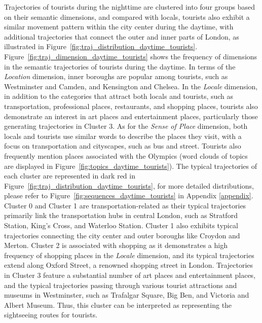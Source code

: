 \documentclass{article}
\theoremstyle{remark}
\begin{document}
Trajectories of tourists during the nighttime are clustered into four groups based on their semantic dimensions, and compared with locals, tourists also exhibit a similar movement pattern within the city center during the daytime, with additional trajectories that connect the outer and inner parts of London, as illustrated in Figure~\ref{fig:traj_distribution_daytime_tourists}. Figure~\ref{fig:traj_dimension_daytime_tourists} shows the frequency of dimensions in the semantic trajectories of tourists during the daytime. In terms of the \textit{Location} dimension, inner boroughs are popular among tourists, such as Westminster and Camden, and Kensington and Chelsea. In the \textit{Locale} dimension, in addition to the categories that attract both locals and tourists, such as transportation, professional places, restaurants, and shopping places, tourists also demonstrate an interest in art places and entertainment places, particularly those generating trajectories in Cluster 3. As for the \textit{Sense of Place} dimension, both locals and tourists use similar words to describe the places they visit, with a focus on transportation and cityscapes, such as bus and street. Tourists also frequently mention places associated with the Olympics (word clouds of topics are displayed in Figure~\ref{fig:topics_daytime_tourists}). The typical trajectories of each cluster are represented in dark red in Figure~\ref{fig:traj_distribution_daytime_tourists}, for more detailed distributions, please refer to Figure~\ref{fig:sequences_daytime_tourists} in Appendix \ref{appendix}. Cluster 0 and Cluster 1 are transportation-related as their typical trajectories primarily link the transportation hubs in central London, such as Stratford Station, King's Cross, and Waterloo Station. Cluster 1 also exhibits typical trajectories connecting the city center and outer boroughs like Croydon and Merton. Cluster 2 is associated with shopping as it demonstrates a high frequency of shopping places in the \textit{Locale} dimension, and its typical trajectories extend along Oxford Street, a renowned shopping street in London. Trajectories in Cluster 3 feature a substantial number of art places and entertainment places, and the typical trajectories passing through various tourist attractions and museums in Westminster, such as Trafalgar Square, Big Ben, and Victoria and Albert Museum. Thus, this cluster can be interpreted as representing the sightseeing routes for tourists.
\end{document}
